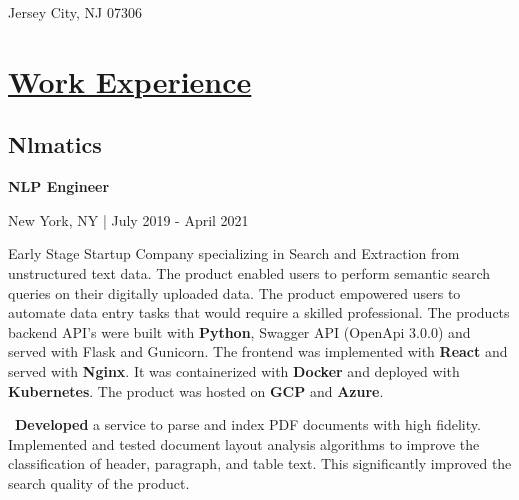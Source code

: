 \documentclass{article}
\begin{document}
\begin{minipage}[t][0pt]{8in\linewidth}
\begin{minipage}[t]{17em\linewidth\hspace{-4em}}
        \hspace{1.25em}\small\mdseries\textrm{Jersey City, NJ 07306}
    \end{minipage}

\vspace{0.5em}

\begin{minipage}[t]{0.45\textwidth\hspace{0in}}

    \section{\underline{Work Experience}}
        \vspace{-0.8em}
        \subsection{Nlmatics}
        \vspace{-0.5em}\hspace{0.1em}
        \mdseries\bfseries{NLP Engineer}
        \vspace{0.1em}
        
        \hspace{0.5em}\mdseries\textrm{New York, NY | July 2019 - April 2021}

        \vspace{-0.8em}
        \begin{minipage}[t]{3.75in\textwidth\hspace{0in}}
            
            \vspace{0.3em}
            {Early Stage Startup Company specializing in Search and Extraction from unstructured text data. The product enabled users to perform semantic search queries on their digitally uploaded data. The product empowered users to automate data entry tasks that would require a skilled professional. The products backend API's were built with \textbf{Python}, Swagger API (OpenApi 3.0.0) and served with Flask and Gunicorn. The frontend was implemented with \textbf{React} and served with \textbf{Nginx}. It was containerized with \textbf{Docker} and deployed with \textbf{Kubernetes}. The product was hosted on \textbf{GCP} and \textbf{Azure}.}

            \vspace{0.3em}
            \hspace{1em}\textasteriskcentered \, \mdseries\textrm{\textbf{Developed} a service to parse and index PDF documents with high fidelity. Implemented and tested document layout analysis algorithms to improve the classification of header, paragraph, and table text. This significantly improved the search quality of the product.}
            

\end{minipage}
\end{minipage}
\end{minipage}
\end{document}
